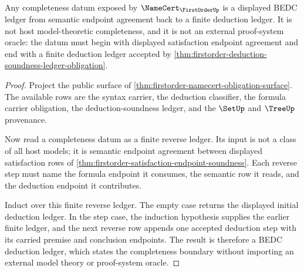 \begin{theorem}\label{thm:firstorder-completeness-boundary-obligation}
Any completeness datum exposed by $\NameCert_{\FirstOrderUp}$ is a displayed
BEDC ledger from semantic endpoint agreement back to a finite deduction
ledger. It is not host model-theoretic completeness, and it is not an
external proof-system oracle: the datum must begin with displayed satisfaction
endpoint agreement and end with a finite deduction ledger accepted by
\autoref{thm:firstorder-deduction-soundness-ledger-obligation}.
\end{theorem}
\begin{proof}
Project the public surface of
\autoref{thm:firstorder-namecert-obligation-surface}. The available rows are
the syntax carrier, the deduction classifier, the formula carrier obligation,
the deduction-soundness ledger, and the $\SetUp$ and $\TreeUp$ provenance.

Now read a completeness datum as a finite reverse ledger. Its input is not a
class of all host models; it is semantic endpoint agreement between displayed
satisfaction rows of
\autoref{thm:firstorder-satisfaction-endpoint-soundness}. Each reverse step
must name the formula endpoint it consumes, the semantic row it reads, and
the deduction endpoint it contributes.

Induct over this finite reverse ledger. The empty case returns the displayed
initial deduction ledger. In the step case, the induction hypothesis supplies
the earlier finite ledger, and the next reverse row appends one accepted
deduction step with its carried premise and conclusion endpoints. The result
is therefore a BEDC deduction ledger, which states the completeness boundary
without importing an external model theory or proof-system oracle.
\end{proof}

